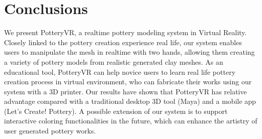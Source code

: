 \section{Conclusions}
\label{sec:8}

We present PotteryVR, a realtime pottery modeling system in Virtual Reality.
Closely linked to the pottery creation experience real life, our system enables users to manipulate the mesh in realtime with two hands, allowing them creating a variety of pottery models from realistic generated clay meshes.
As an educational tool, PotteryVR can help novice users to learn real life pottery creation process in virtual environment, who can fabricate their works using our system with a 3D printer.
Our results have shown that PotteryVR has relative advantage compared with a traditional desktop 3D tool (Maya) and a mobile app (Let's Create! Pottery).
A possible extension of our system is to support interactive coloring functionalities in the future, which can enhance the artistry of user generated pottery works.


